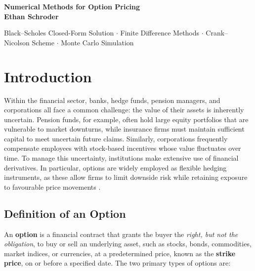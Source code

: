 \documentclass[12pt]{article}
\begin{document}
\begin{center}
\vspace*{4cm}
{\Huge \bf{Numerical Methods for Option Pricing}}\\
\vspace{2.5cm}
{\LARGE \bf{ Ethan Schroder }}\\
\vspace*{10.4cm}

{\large Black–Scholes Closed-Form Solution $\cdot$ Finite Difference Methods $\cdot$ Crank–Nicolson Scheme $\cdot$ Monte Carlo Simulation  }
\end{center}

\newpage

\tableofcontents
\newpage




\section{Introduction}

Within the financial sector, banks, hedge funds, pension managers, and corporations all face a common challenge: the value of their assets is inherently uncertain. Pension funds, for example, often hold large equity portfolios that are vulnerable to market downturns, while insurance firms must maintain sufficient capital to meet uncertain future claims. Similarly, corporations frequently compensate employees with stock-based incentives whose value fluctuates over time. To manage this uncertainty, institutions make extensive use of financial derivatives. In particular, options are widely employed as flexible hedging instruments, as these allow firms to limit downside risk while retaining exposure to favourable price movements \cite{bartram2006use}.

\subsection{Definition of an Option}

An \textbf{option} is a financial contract that grants the buyer the \textit{right, but not the obligation}, to buy or sell an underlying asset, such as stocks, bonds, commodities, market indices, or currencies, at a predetermined price, known as the \textbf{strike price}, on or before a specified date. The two primary types of options are:
\end{document}
